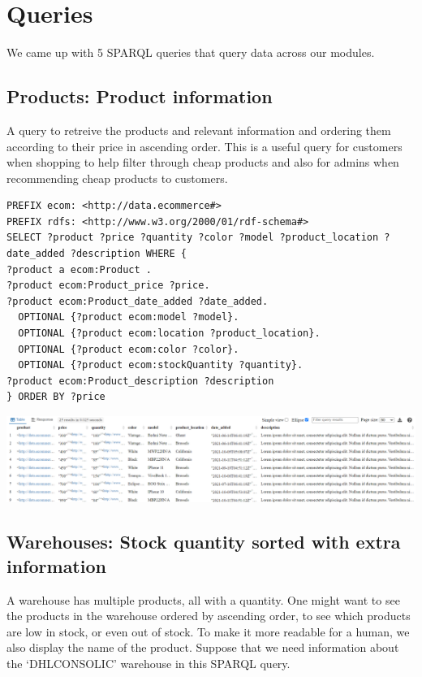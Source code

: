 \documentclass{article}
\begin{document}
\section{Queries}
We came up with 5 SPARQL queries that query data across our modules.

\subsection{Products: Product information}
A query to retreive the products and relevant information and ordering them according to their price in ascending order. This is a useful query for customers when shopping to help filter through cheap products and also for admins when recommending cheap products to customers.

\begin{lstlisting}[breaklines, frame=single]
PREFIX ecom: <http://data.ecommerce#>
PREFIX rdfs: <http://www.w3.org/2000/01/rdf-schema#>
SELECT ?product ?price ?quantity ?color ?model ?product_location ?date_added ?description WHERE {
?product a ecom:Product .
?product ecom:Product_price ?price.
?product ecom:Product_date_added ?date_added.
  OPTIONAL {?product ecom:model ?model}.
  OPTIONAL {?product ecom:location ?product_location}.
  OPTIONAL {?product ecom:color ?color}.
  OPTIONAL {?product ecom:stockQuantity ?quantity}.
?product ecom:Product_description ?description
} ORDER BY ?price
\end{lstlisting}

\begin{center}
   \includegraphics[scale=1.05]{OISreport-product-query.png}
\end{center}



\subsection{Warehouses: Stock quantity sorted with extra information}
A warehouse has multiple products, all with a quantity. One might want to see the products in the warehouse ordered by ascending order, to see which products are low in stock, or even out of stock. To make it more readable for a human, we also display the name of the product. Suppose that we need information about the `DHLCONSOLIC' warehouse in this SPARQL query.
\end{document}
